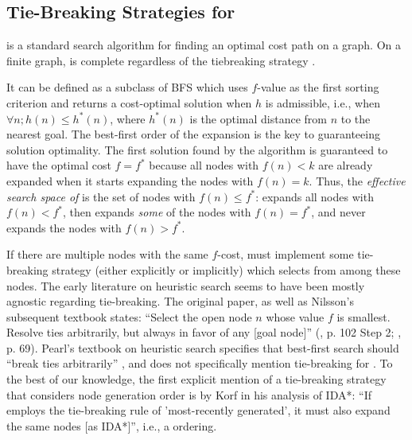 \subsection{Tie-Breaking Strategies for \astar}

\label{sec:astar-background}

\astar is a standard search algorithm for finding an optimal cost path
on a graph.
On a finite graph, \astar is
complete regardless of the tiebreaking strategy \cite{hart1968formal}.

It can be defined as a subclass of BFS which uses $f$-value as the first sorting criterion
and returns a cost-optimal solution when $h$ is admissible, i.e., when
$\forall n; h(n) \leq h^*(n)$, where $h^*(n)$ is the optimal distance from $n$ to
the nearest goal.
% 
The best-first order of the expansion is the key to guaranteeing solution optimality. 
The first solution found by the algorithm is guaranteed to have the optimal cost $f=f^*$ because 
all nodes with $f(n) < k$ are already expanded when it starts expanding
the nodes with $f(n) = k$.
Thus, the \emph{effective search space of \astar} is the set of nodes with 
$f(n) \leq f^*$: \astar expands all nodes with $f(n) < f^*$, then
expands \emph{some} of the nodes with $f(n) = f^*$, and
never expands the nodes with $f(n) > f^*$.

If there are multiple nodes with the same $f$-cost, \astar
must implement some tie-breaking strategy (either
explicitly or implicitly) which selects from among these nodes.
The early literature on heuristic search seems to have been mostly agnostic regarding tie-breaking.
The original \astar paper, as well as Nilsson's subsequent textbook 
states: ``Select the open node $n$ whose value $f$
is smallest. Resolve ties arbitrarily, but always in favor of any [goal
node]'' 
(, p. 102 Step 2; , p. 69).
Pearl's textbook on heuristic search specifies that best-first search should ``break ties arbitrarily'' \cite[p. 48, Step 3]{pearl1984heuristics}, and does not specifically mention tie-breaking for \astar.
To the best of our knowledge, the first explicit mention of a tie-breaking strategy that considers node generation order is by Korf in his analysis of IDA*: ``If \astar employs the tie-breaking rule of 'most-recently generated', it must also expand the same nodes [as IDA*]'', i.e., a \lifo ordering.

